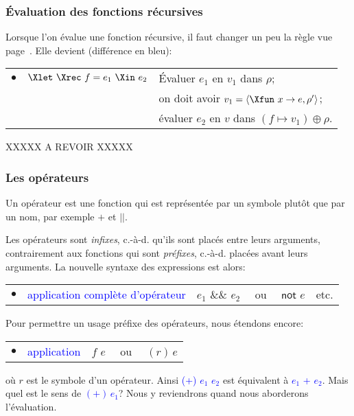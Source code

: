 %
\begin{frame}
\frametitle{Évaluation des fonctions récursives}

Lorsque l'on évalue une fonction récursive, il faut changer un peu la
règle vue page~\pageref{semantique_let_in}. Elle devient (différence
en bleu):

\begin{tabular}{rll}
    $\bullet$
  & $\Xlet \,\, \Xrec \,\, f = e_1 \,\, \Xin \,\, e_2$
  & Évaluer $e_1$ en $v_1$ dans $\rho$;\\
  &
  & on doit avoir $v_1 = \langle\Xfun \,\, x \rightarrow
  e,\rho'\rangle$;\\ 
  & 
  & évaluer $e_2$ en $v$ dans $(f \mapsto v_1) \oplus \rho$.
\end{tabular}

XXXXX A REVOIR XXXXX

\end{frame}

%
\begin{frame}
\frametitle{Les opérateurs}

Un opérateur est une fonction qui est représentée par un symbole
plutôt que par un nom, par exemple $+$ et $||$.

Les opérateurs sont \emph{infixes}, c.-à-d. qu'ils sont placés entre
leurs arguments, contrairement aux fonctions qui sont \emph{préfixes},
c.-à-d. placées avant leurs arguments. La nouvelle syntaxe des
expressions est alors:

\begin{tabular}{rll}
    $\bullet$
  & \textcolor{blue}{application complète d'opérateur}
  & $e_1 \,\, \textsf{\&\&} \,\, e_2$ \ \ ou \ \ $\textsf{not} \,\, e$
     \,\, etc.
\end{tabular}

Pour permettre un usage préfixe des opérateurs, nous étendons encore:

\begin{tabular}{rll}
    $\bullet$
  & \textcolor{blue}{application}
  & $f \,\, e$ \ \ ou \ \ $(r) \, e$
\end{tabular}

où $r$ est le symbole d'un opérateur. Ainsi \textcolor{blue}{\textsf{(+)} $e_1$
$e_2$} est équivalent à \textcolor{blue}{$e_1$ \textsf{+} $e_2$}. Mais quel est
le sens de \textcolor{blue}{$(+) \, e_1$}? Nous y reviendrons quand nous aborderons
l'évaluation.

\end{frame}

